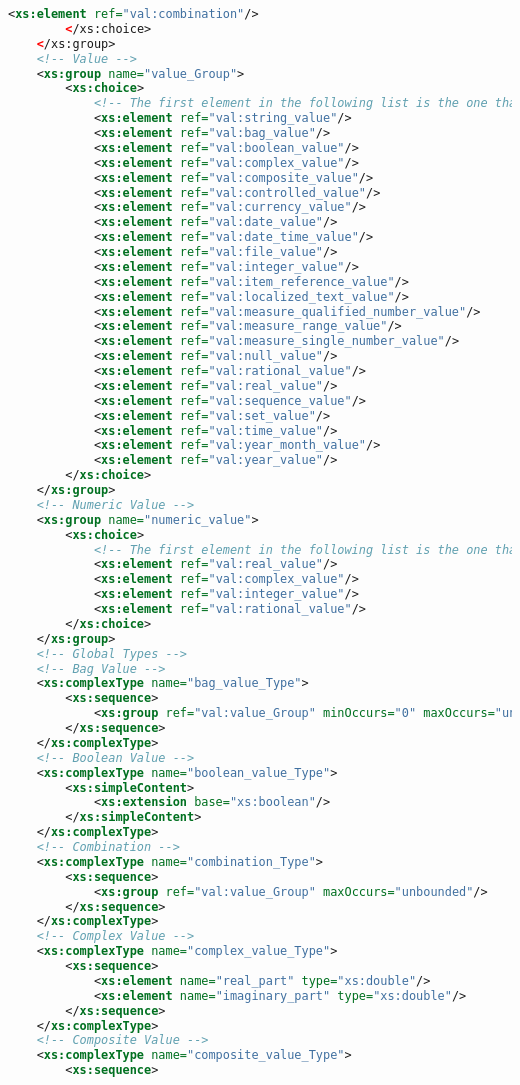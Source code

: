 \begin{lstlisting}[caption=value.xsd, language=XML, label=lst:value_xsd]
			<xs:element ref="val:combination"/>
		</xs:choice>
	</xs:group>
	<!-- Value -->
	<xs:group name="value_Group">
		<xs:choice>
			<!-- The first element in the following list is the one that will be created by default in some XML editors whenever a property_value is added. -->
			<xs:element ref="val:string_value"/>
			<xs:element ref="val:bag_value"/>
			<xs:element ref="val:boolean_value"/>
			<xs:element ref="val:complex_value"/>
			<xs:element ref="val:composite_value"/>
			<xs:element ref="val:controlled_value"/>
			<xs:element ref="val:currency_value"/>
			<xs:element ref="val:date_value"/>
			<xs:element ref="val:date_time_value"/>
			<xs:element ref="val:file_value"/>
			<xs:element ref="val:integer_value"/>
			<xs:element ref="val:item_reference_value"/>
			<xs:element ref="val:localized_text_value"/>
			<xs:element ref="val:measure_qualified_number_value"/>
			<xs:element ref="val:measure_range_value"/>
			<xs:element ref="val:measure_single_number_value"/>
			<xs:element ref="val:null_value"/>
			<xs:element ref="val:rational_value"/>
			<xs:element ref="val:real_value"/>
			<xs:element ref="val:sequence_value"/>
			<xs:element ref="val:set_value"/>
			<xs:element ref="val:time_value"/>
			<xs:element ref="val:year_month_value"/>
			<xs:element ref="val:year_value"/>
		</xs:choice>
	</xs:group>
	<!-- Numeric Value -->
	<xs:group name="numeric_value">
		<xs:choice>
			<!-- The first element in the following list is the one that will be created by default in some XML editors whenever a property_value is added. -->
			<xs:element ref="val:real_value"/>
			<xs:element ref="val:complex_value"/>
			<xs:element ref="val:integer_value"/>
			<xs:element ref="val:rational_value"/>
		</xs:choice>
	</xs:group>
	<!-- Global Types -->
	<!-- Bag Value -->
	<xs:complexType name="bag_value_Type">
		<xs:sequence>
			<xs:group ref="val:value_Group" minOccurs="0" maxOccurs="unbounded"/>
		</xs:sequence>
	</xs:complexType>
	<!-- Boolean Value -->
	<xs:complexType name="boolean_value_Type">
		<xs:simpleContent>
			<xs:extension base="xs:boolean"/>
		</xs:simpleContent>
	</xs:complexType>
	<!-- Combination -->
	<xs:complexType name="combination_Type">
		<xs:sequence>
			<xs:group ref="val:value_Group" maxOccurs="unbounded"/>
		</xs:sequence>
	</xs:complexType>
	<!-- Complex Value -->
	<xs:complexType name="complex_value_Type">
		<xs:sequence>
			<xs:element name="real_part" type="xs:double"/>
			<xs:element name="imaginary_part" type="xs:double"/>
		</xs:sequence>
	</xs:complexType>
	<!-- Composite Value -->
	<xs:complexType name="composite_value_Type">
		<xs:sequence>

\end{lstlisting}
